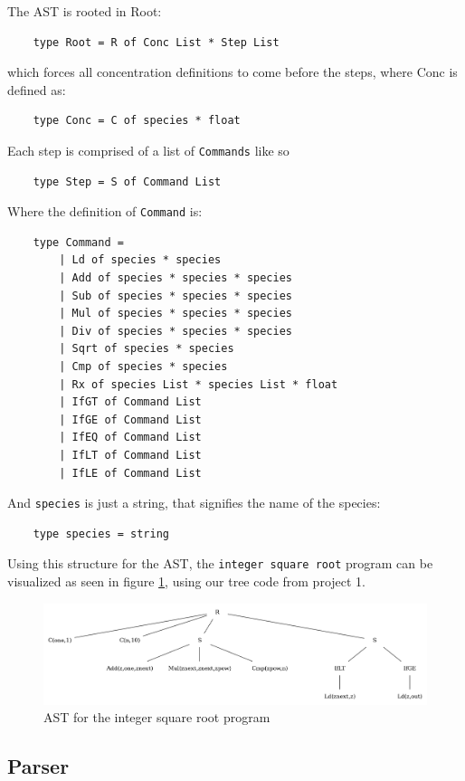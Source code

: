 The AST is rooted in Root: 
\begin{verbatim}
    type Root = R of Conc List * Step List
\end{verbatim}
which forces all concentration definitions to come before the steps, where Conc is defined as:
\begin{verbatim}
    type Conc = C of species * float
\end{verbatim}
Each step is comprised of a list of \texttt{Commands} like so
\begin{verbatim}
    type Step = S of Command List
\end{verbatim}
Where the definition of \texttt{Command} is:
\begin{verbatim}
    type Command =
        | Ld of species * species
        | Add of species * species * species
        | Sub of species * species * species
        | Mul of species * species * species
        | Div of species * species * species
        | Sqrt of species * species
        | Cmp of species * species
        | Rx of species List * species List * float
        | IfGT of Command List
        | IfGE of Command List
        | IfEQ of Command List
        | IfLT of Command List
        | IfLE of Command List
\end{verbatim}
And \texttt{species} is just a string, that signifies the name of the species:
\begin{verbatim}
    type species = string
\end{verbatim}

Using this structure for the AST, the \texttt{integer square root} program can be visualized as seen in figure \ref{fig:ast_sqrt}, using our tree code from project 1.  

\begin{figure}[ht!]
    \centering
    \includegraphics[width=\textwidth]{report/figures/ast_sqrt.png}
    \caption{AST for the integer square root program}
    \label{fig:ast_sqrt}
\end{figure}


\subsection{Parser}

